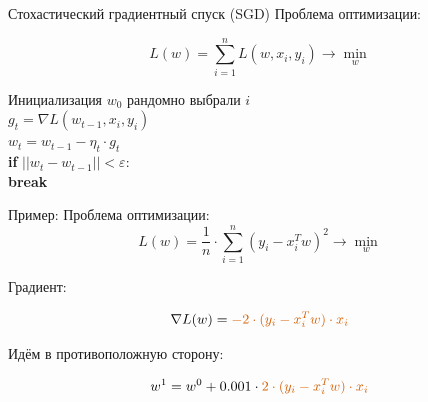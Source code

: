 \documentclass[notes,12pt, aspectratio=169]{beamer}
\newcommand{\pgr}[1]{{\color{green} \textbf{#1}}}
\begin{document}
\begin{frame}[fragile]{Стохастический градиентный спуск (SGD)}
Проблема оптимизации: 

\[   
L(w) = \sum_{i=1}^n L(w, x_i, y_i) \to \min_{w}
\]

Инициализация $w_0$ 
\hspace{15pt} рандомно выбрали $i$ \\
\pgr{\hspace{15pt}} $g_t = \nabla L(w_{t-1}, x_i, y_i)$ \\
\pgr{\hspace{15pt}} $w_t = w _{t-1} - \eta_t \cdot g_t  $ \\
\pgr{\hspace{15pt} if} $||w_t - w_{t-1}|| < \varepsilon:$ \\
\pgr{\hspace{30pt} break}
\end{frame}



\begin{frame}[fragile]{Пример:}
Проблема оптимизации: 
\[   
L(w) = \frac{1}{n} \cdot \sum_{i=1}^n  (y_i - x_i^T w)^2 \to \min_{w}
\]

Градиент: 

\[   
\nabla L(w) =  { \color{red} - 2 \cdot (y_i - x_i^T w)\cdot x_i }
\]

Идём в противоположную сторону: 

\[
w^1 =   w^0  +  0.001 \cdot   {\color{red}  2 \cdot (y_i - x_i^T w)\cdot x_i }
\]
\end{frame}
\end{document}
